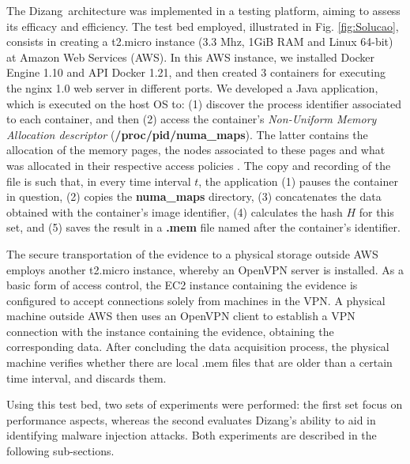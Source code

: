 \documentclass[conference]{IEEEtran}
\newcommand{\marcos}[1]{{\color{green}{MARCOS: #1}}}
\newcommand{\fancyname}{Dizang}
\begin{document}
The \fancyname\ architecture was implemented in a testing platform, aiming to assess its efficacy and efficiency.
%
The test bed employed, illustrated in Fig. \ref{fig:Solucao}, consists in creating a t2.micro instance (3.3 Mhz, 1GiB RAM and Linux 64-bit) at Amazon Web Services (AWS).
%
In this AWS instance, we installed Docker Engine 1.10 and API Docker 1.21, and then created 3 containers for executing the nginx 1.0 web server in different ports. 
%
We developed a Java application, which is executed on the host OS to: 
(1) discover the process identifier associated to each container, and then 
(2) access the container's 
\textit{Non-Uniform Memory Allocation descriptor} (\textbf{/proc/pid/numa\_maps}).
%
The latter contains the allocation of the memory pages, the nodes associated to these pages and what was allocated in their respective access policies \cite{UnixManPages_numa_maps}.
%
The copy and recording of the file is such that, in every time interval $t$, the application (1) pauses the container in question, (2) copies the \textbf{numa\_maps} directory, (3) concatenates the data obtained with the container's image identifier, (4) calculates the hash $H$ for this set, and (5) saves the result in a \textbf{.mem} file named after the container's identifier.


The secure transportation of the evidence to a physical storage outside AWS employs another t2.micro instance, whereby an OpenVPN server is installed.
%
As a basic form of access control, the EC2 instance containing the evidence is configured to accept connections solely from machines in the VPN.
%
A physical machine outside AWS then uses an OpenVPN client to establish a VPN connection with the instance containing the evidence, obtaining the corresponding data.
%
After concluding the data acquisition process, the physical machine verifies whether there are local .mem files that are older than a certain time interval, and discards them.


Using this test bed, two sets of experiments were performed: the first set focus on performance aspects, whereas the second evaluates \fancyname's ability to aid in identifying malware injection attacks.
%
Both experiments are described in the following sub-sections.
\end{document}
